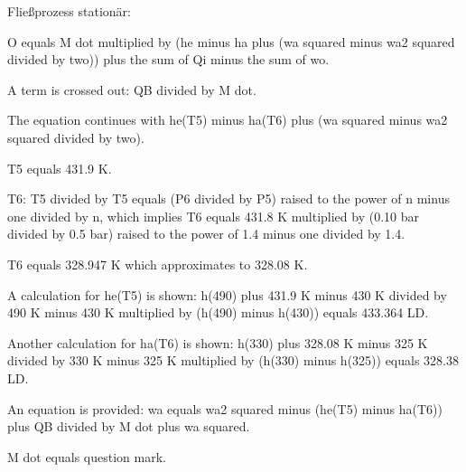 Fließprozess stationär:

O equals M dot multiplied by (he minus ha plus (wa squared minus wa2 squared divided by two)) plus the sum of Qi minus the sum of wo.

A term is crossed out: QB divided by M dot. 

The equation continues with he(T5) minus ha(T6) plus (wa squared minus wa2 squared divided by two).

T5 equals 431.9 K.

T6: T5 divided by T5 equals (P6 divided by P5) raised to the power of n minus one divided by n, which implies T6 equals 431.8 K multiplied by (0.10 bar divided by 0.5 bar) raised to the power of 1.4 minus one divided by 1.4.

T6 equals 328.947 K which approximates to 328.08 K.

A calculation for he(T5) is shown: h(490) plus 431.9 K minus 430 K divided by 490 K minus 430 K multiplied by (h(490) minus h(430)) equals 433.364 LD. 

Another calculation for ha(T6) is shown: h(330) plus 328.08 K minus 325 K divided by 330 K minus 325 K multiplied by (h(330) minus h(325)) equals 328.38 LD.

An equation is provided: wa equals wa2 squared minus (he(T5) minus ha(T6)) plus QB divided by M dot plus wa squared.

M dot equals question mark.